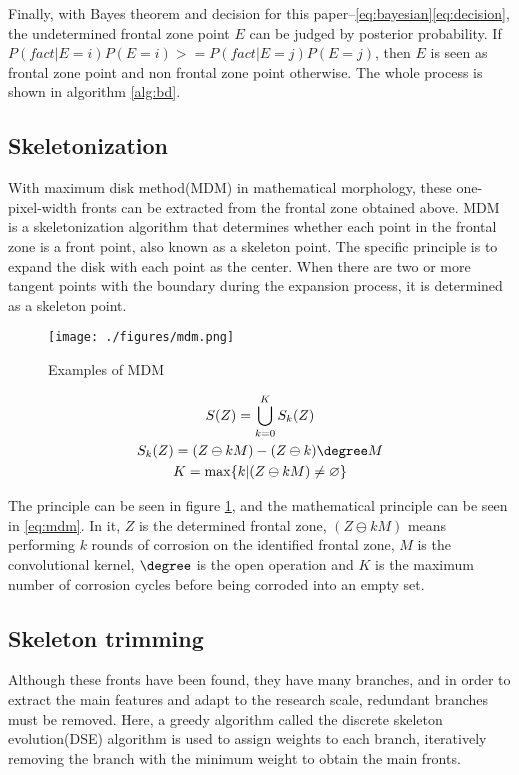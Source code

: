 Finally, with Bayes theorem and decision for this paper--\eqref{eq:bayesian}\eqref{eq:decision}, the undetermined frontal zone point $E$ can be judged by posterior probability. If $P(fact|E=i)P(E=i)>=P(fact|E=j)P(E=j)$, then $E$ is seen as frontal zone point and non frontal zone point otherwise. The whole process is shown in algorithm \ref{alg:bd}.

\subsection{Skeletonization}
With maximum disk method(MDM) in mathematical morphology, these one-pixel-width fronts can be extracted from the frontal zone obtained above. MDM is a skeletonization algorithm that determines whether each point in the frontal zone is a front point, also known as a skeleton point. The specific principle is to expand the disk with each point as the center. When there are two or more tangent points with the boundary during the expansion process, it is determined as a skeleton point. 

\begin{figure}
	\centering
	\texttt{[image: ./figures/mdm.png]}
	\caption{Examples of MDM} 
	\label{fig:mdm} 
\end{figure}

\begin{equation}\label{eq:mdm}
	\begin{gathered}
		S(Z)=\bigcup_{k=0}^K S_k (Z)\\
		S_k (Z)=(Z \ominus kM)-(Z \ominus k)\degree M\\
		K= \max \{k|(Z \ominus kM) \neq \varnothing \}
	\end{gathered}
\end{equation}

The principle can be seen in figure \ref{fig:mdm}, and the mathematical principle can be seen in \eqref{eq:mdm}. In it, $Z$ is the determined frontal zone, $(Z \ominus kM)$ means performing $k$ rounds of corrosion on the identified frontal zone, $M$ is the convolutional kernel, $\degree$ is the open operation and $K$ is the maximum number of corrosion cycles before being corroded into an empty set.

\subsection{Skeleton trimming}
Although these fronts have been found, they have many branches, and in order to extract the main features and adapt to the research scale, redundant branches must be removed. Here, a greedy algorithm called the discrete skeleton evolution(DSE) algorithm is used to assign weights to each branch, iteratively removing the branch with the minimum weight to obtain the main fronts\cite{Bai-2007, Vincent-1993}.

